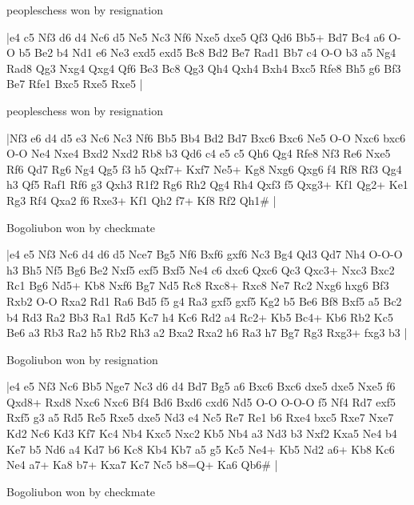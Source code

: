 \showboard

peopleschess won by resignation

\makegametitle
|e4 c5 Nf3 d6 d4 Nc6 d5 Ne5 Nc3 Nf6 Nxe5 dxe5 Qf3 Qd6 Bb5+ Bd7 Bc4 a6 O-O b5 Be2 b4 Nd1 e6 Ne3 exd5 exd5 Bc8 Bd2 Be7 Rad1 Bb7 c4 O-O b3 a5 Ng4 Rad8 Qg3 Nxg4 Qxg4 Qf6 Be3 Bc8 Qg3 Qh4 Qxh4 Bxh4 Bxc5 Rfe8 Bh5 g6 Bf3 Be7 Rfe1 Bxc5 Rxe5 Rxe5  |

\showboard

peopleschess won by resignation

\makegametitle
|Nf3 e6 d4 d5 e3 Nc6 Nc3 Nf6 Bb5 Bb4 Bd2 Bd7 Bxc6 Bxc6 Ne5 O-O Nxc6 bxc6 O-O Ne4 Nxe4 Bxd2 Nxd2 Rb8 b3 Qd6 c4 e5 c5 Qh6 Qg4 Rfe8 Nf3 Re6 Nxe5 Rf6 Qd7 Rg6 Ng4 Qg5 f3 h5 Qxf7+ Kxf7 Ne5+ Kg8 Nxg6 Qxg6 f4 Rf8 Rf3 Qg4 h3 Qf5 Raf1 Rf6 g3 Qxh3 R1f2 Rg6 Rh2 Qg4 Rh4 Qxf3 f5 Qxg3+ Kf1 Qg2+ Ke1 Rg3 Rf4 Qxa2 f6 Rxe3+ Kf1 Qh2 f7+ Kf8 Rf2 Qh1\#  |

\showboard

Bogoliubon won by checkmate

\makegametitle
|e4 e5 Nf3 Nc6 d4 d6 d5 Nce7 Bg5 Nf6 Bxf6 gxf6 Nc3 Bg4 Qd3 Qd7 Nh4 O-O-O h3 Bh5 Nf5 Bg6 Be2 Nxf5 exf5 Bxf5 Ne4 c6 dxc6 Qxc6 Qc3 Qxc3+ Nxc3 Bxc2 Rc1 Bg6 Nd5+ Kb8 Nxf6 Bg7 Nd5 Rc8 Rxc8+ Rxc8 Ne7 Rc2 Nxg6 hxg6 Bf3 Rxb2 O-O Rxa2 Rd1 Ra6 Bd5 f5 g4 Ra3 gxf5 gxf5 Kg2 b5 Be6 Bf8 Bxf5 a5 Bc2 b4 Rd3 Ra2 Bb3 Ra1 Rd5 Kc7 h4 Kc6 Rd2 a4 Rc2+ Kb5 Bc4+ Kb6 Rb2 Kc5 Be6 a3 Rb3 Ra2 h5 Rb2 Rh3 a2 Bxa2 Rxa2 h6 Ra3 h7 Bg7 Rg3 Rxg3+ fxg3 b3  |

\showboard

Bogoliubon won by resignation

\makegametitle
|e4 e5 Nf3 Nc6 Bb5 Nge7 Nc3 d6 d4 Bd7 Bg5 a6 Bxc6 Bxc6 dxe5 dxe5 Nxe5 f6 Qxd8+ Rxd8 Nxc6 Nxc6 Bf4 Bd6 Bxd6 cxd6 Nd5 O-O O-O-O f5 Nf4 Rd7 exf5 Rxf5 g3 a5 Rd5 Re5 Rxe5 dxe5 Nd3 e4 Nc5 Re7 Re1 b6 Rxe4 bxc5 Rxe7 Nxe7 Kd2 Nc6 Kd3 Kf7 Kc4 Nb4 Kxc5 Nxc2 Kb5 Nb4 a3 Nd3 b3 Nxf2 Kxa5 Ne4 b4 Ke7 b5 Nd6 a4 Kd7 b6 Kc8 Kb4 Kb7 a5 g5 Kc5 Ne4+ Kb5 Nd2 a6+ Kb8 Kc6 Ne4 a7+ Ka8 b7+ Kxa7 Kc7 Nc5 b8=Q+ Ka6 Qb6\#  |

\showboard

Bogoliubon won by checkmate

